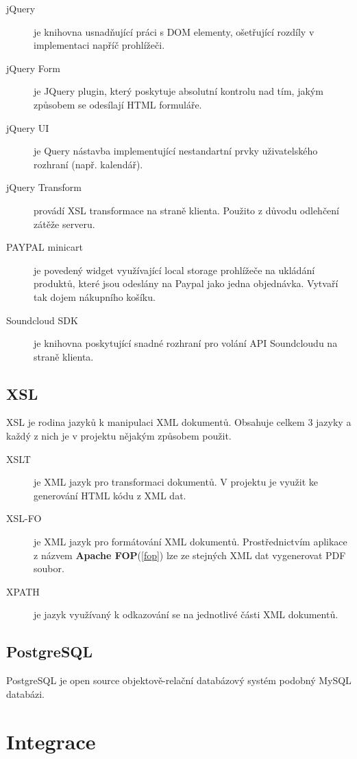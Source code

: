 \documentclass[12pt]{article}
\begin{document}
\begin{description}
\item[jQuery] je knihovna usnadňující práci s DOM elementy, ošetřující rozdíly v implementaci napříč prohlížeči.
\item[jQuery Form] je JQuery plugin, který poskytuje absolutní kontrolu nad tím, jakým způsobem se odesílají HTML formuláře.
\item[jQuery UI] je Query nástavba implementující nestandartní prvky uživatelského rozhraní (např. kalendář).
\item[jQuery Transform] provádí XSL transformace na straně klienta. Použito z důvodu odlehčení zátěže serveru.
\item[PAYPAL minicart] je povedený widget využívající local storage prohlížeče na ukládání produktů, které jsou odeslány na Paypal jako jedna objednávka. Vytvaří tak dojem nákupního košíku.
\item[Soundcloud SDK] je knihovna poskytující snadné rozhraní pro volání API Soundcloudu na straně klienta.
\end{description}

\subsection{XSL}
XSL\cite{w3cXSL} je rodina jazyků k manipulaci XML dokumentů. Obsahuje celkem 3 jazyky a každý z nich je v projektu nějakým způsobem použit.
\begin{description}
\item[XSLT] je XML jazyk pro transformaci dokumentů. V projektu je využit ke generování HTML kódu z XML dat.
\item[XSL-FO] je XML jazyk pro formátování XML dokumentů. Prostřednictvím aplikace z názvem \textbf{Apache FOP}(\ref{fop}) lze ze stejných XML dat vygenerovat PDF soubor.
\item[XPATH] je jazyk využívaný k odkazování se na jednotlivé části XML dokumentů.
\end{description}

\subsection{PostgreSQL}
PostgreSQL je open source objektově-relační databázový systém podobný MySQL databázi.

\newpage

\section{Integrace}
\end{document}
